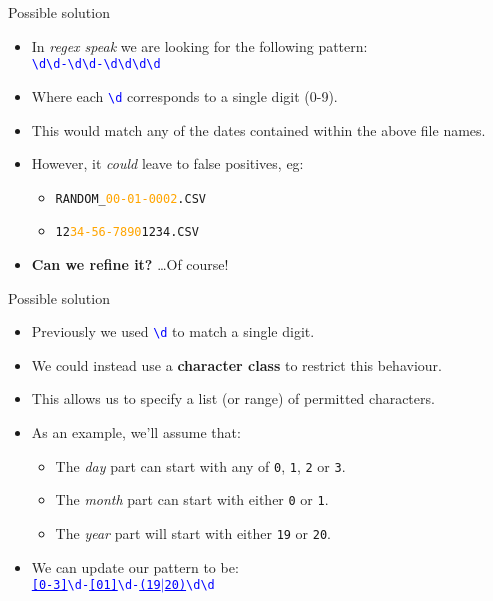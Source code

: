\documentclass[
	usenames,
	dvipsnames,
] {beamer}
\newcommand{\reDigit}{\textbackslash{}d}
\newcommand{\rePattern}[1]{{\Large\texttt{\textcolor{blue}{#1}}}}
\begin{document}
\begin{frame}{Possible solution}
	\begin{itemize}[label=\textbullet]
		\item In \textit{regex speak} we are looking for the following pattern: \\
		      \bigskip
		      \hspace*{3em}
		      \rePattern{\reDigit\reDigit-\reDigit\reDigit-\reDigit\reDigit\reDigit\reDigit}
				\pause
		      \bigskip		      
		\item Where each \rePattern{\reDigit} corresponds to a single digit (0-9).
		      \pause
		\item This would match any of the dates contained within the above file names.
		      \pause
		\item However, it \textit{could} leave to false positives, eg:
		      \begin{itemize}[label=\textendash]
			      	\item \texttt{RANDOM\_\textcolor{orange}{00-01-0002}.CSV}
			      	      \pause
			      	\item \texttt{12\textcolor{orange}{34-56-7890}1234.CSV}
			      		\pause
		      \end{itemize}		      
		\item \textbf{Can we refine it?}
		      \pause
		      \ldots Of course!
	\end{itemize}
\end{frame}
    
\begin{frame}{Possible solution}
	\begin{itemize}[label=\textbullet]
		\item Previously we used \rePattern{\reDigit} to match a single digit.
		      \pause
		\item We could instead use a \textbf{character class} to restrict this behaviour.
		      \pause
		\item This allows us to specify a list (or range) of permitted characters.
		      \pause
		\item As an example, we'll assume that:
		      \pause
		      \begin{itemize}[label=\textendash]
			      	\item The \textit{day} part can start with any of \texttt{0}, \texttt{1}, \texttt{2} or \texttt{3}.
			      	      \pause
			      	\item The \textit{month} part can start with either \texttt{0} or \texttt{1}.
			      	      \pause
			      	\item The \textit{year} part will start with either \texttt{19} or \texttt{20}.
			      		\pause
		      \end{itemize}		      
		      \bigskip
		\item We can update our pattern to be: \\
		      \bigskip
		      \hspace*{3em}
		      \rePattern{\underline{[0-3]}\reDigit-\underline{[01]}\reDigit-\underline{(19$|$20)}\reDigit\reDigit}
	\end{itemize}
\end{frame}
\end{document}
